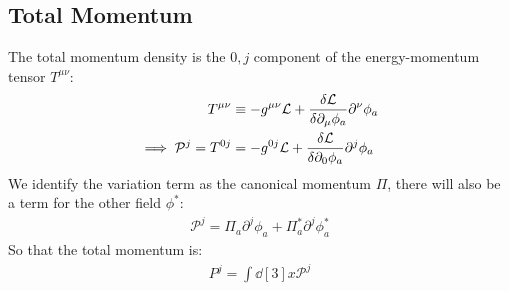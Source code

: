 \documentclass[12pt]{article}
\renewcommand{\L}{\mathcal{L}}
\renewcommand{\P}{\mathcal{P}}
\newcommand{\D}{\partial}
\newcommand{\phis}{\phi^*}
\begin{document}
\subsection{Total Momentum}
The total momentum density is the $0,j$ component of the energy-momentum tensor $T^{\mu\nu}$:
\begin{align*}
  T^{\mu\nu}&\equiv-g^{\mu\nu}\L+\fdv{\L}{\D_\mu\phi_a}\D^\nu\phi_a\\
  \implies \P^j=T^{0j}&=-g^{0j}\L+\fdv{\L}{\D_0\phi_a}\D^j\phi_a
\end{align*}
We identify the variation term as the canonical momentum $\Pi$, there will also be a term for the other field $\phis$:
\begin{align*}
  \boxed{\P^j=\Pi_a\D^j\phi_a+\Pi_a^*\D^j\phis_a}
\end{align*}
So that the total momentum is:
\begin{align*}
  \boxed{P^j=\int\dd[3]{x}\P^j}
\end{align*}
\end{document}
